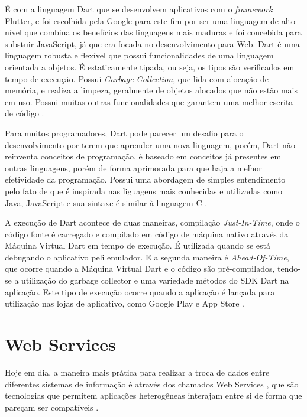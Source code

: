 É com a linguagem Dart que se desenvolvem aplicativos com o \textit{framework} Flutter, e foi escolhida pela Google para este fim por ser uma linguagem de alto-nível que combina os benefícios das linguagens mais maduras e foi concebida para substuir JavaScript, já que era focada no desenvolvimento para Web. Dart é uma linguagem robusta e flexível que possui funcionalidades de uma linguagem orientada a objetos. É estaticamente tipada, ou seja, os tipos são verificados em tempo de execução. Possui \textit{Garbage Collection}, que lida com alocação de memória, e realiza a limpeza, geralmente de objetos alocados que não estão mais em uso. Possui muitas outras funcionalidades que garantem uma melhor escrita de código \cite{biessek2019dart}.

Para muitos programadores, Dart pode parecer um desafio para o desenvolvimento por terem que aprender uma nova linguagem, porém, Dart não reinventa conceitos de programação, é baseado em conceitos já presentes em outras linguagens, porém de forma aprimorada para que haja a melhor efetividade da programação. Possui uma abordagem de simples entendimento pelo fato de que é inspirada nas liguagens mais conhecidas e utilizadas como Java, JavaScript e sua sintaxe é similar à linguagem C \cite{clow2019flutter}.

A execução de Dart acontece de duas maneiras, compilação \textit{Just-In-Time}, onde o código fonte é carregado e compilado em código de máquina nativo através da Máquina Virtual Dart em tempo de execução. É utilizada quando se está debugando o aplicativo peli emulador. 
E a segunda maneira é \textit{Ahead-Of-Time}, que ocorre quando a Máquina Virtual Dart e o código são pré-compilados, tendo-se a utilização do garbage collector e uma variedade métodos do SDK Dart na aplicação. Este tipo de execução ocorre quando a aplicação é lançada para utilização nas lojas de aplicativo, como Google Play e App Store \cite{napoli2019beginning}.



\section{Web Services}


Hoje em dia, a maneira mais prática para realizar a troca de dados entre diferentes sistemas de informação é através dos chamados Web Services \cite{tihomirovs2016webservices}, que são tecnologias que permitem aplicações heterogêneas interajam entre si de forma que pareçam ser compatíveis \cite{eulalio2016webservices}. 


